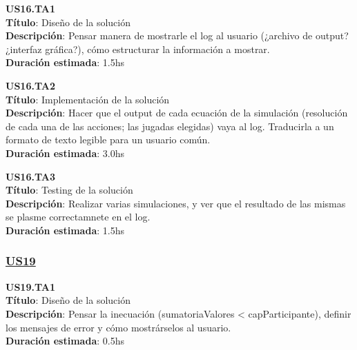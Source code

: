 \begin{tcolorbox}
\textbf{US16.TA1} \\
\textbf{Título}:  Diseño de la solución\\
\textbf{Descripción}:  Pensar manera de mostrarle el log al usuario (¿archivo de output? ¿interfaz gráfica?), cómo estructurar la información a mostrar. \\
\textbf{Duración estimada}: 1.5hs
\end{tcolorbox}
\vspace{10pt}

\begin{tcolorbox}
\textbf{US16.TA2} \\
\textbf{Título}: Implementación de la solución\\
\textbf{Descripción}: Hacer que el output de cada ecuación de la simulación (resolución de cada una de las acciones; las jugadas elegidas) vaya al log. Traducirla a un formato de texto legible para un usuario común.\\
\textbf{Duración estimada}: 3.0hs
\end{tcolorbox}
\vspace{10pt}

\begin{tcolorbox}
\textbf{US16.TA3} \\
\textbf{Título}: Testing de la solución \\
\textbf{Descripción}: Realizar varias simulaciones, y ver que el resultado de las mismas se plasme correctamnete en el log.\\
\textbf{Duración estimada}: 1.5hs
\end{tcolorbox}
\vspace{10pt}



\subsubsection*{\underline{US19}}

\begin{tcolorbox}
\textbf{US19.TA1} \\
\textbf{Título}:  Diseño de la solución\\
\textbf{Descripción}: Pensar la inecuación (sumatoriaValores < capParticipante), definir los mensajes de error y cómo mostrárselos al usuario.\\ 
\textbf{Duración estimada}: 0.5hs
\end{tcolorbox}
\vspace{10pt}

